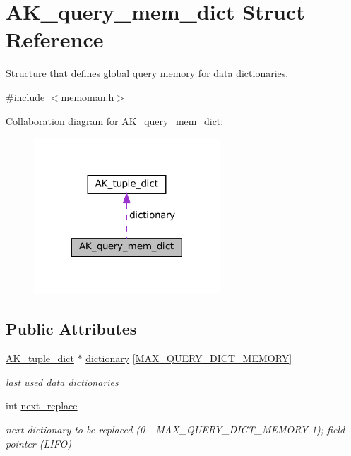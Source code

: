 \hypertarget{structAK__query__mem__dict}{}\section{A\+K\+\_\+query\+\_\+mem\+\_\+dict Struct Reference}
\label{structAK__query__mem__dict}


Structure that defines global query memory for data dictionaries.  




{\ttfamily \#include $<$memoman.\+h$>$}



Collaboration diagram for A\+K\+\_\+query\+\_\+mem\+\_\+dict\+:\nopagebreak
\begin{figure}[H]
\begin{center}
\leavevmode
\includegraphics[width=197pt]{structAK__query__mem__dict__coll__graph}
\end{center}
\end{figure}
\subsection*{Public Attributes}
\begin{DoxyCompactItemize}
\item 
\mbox{\label{structAK__query__mem__dict_a7345f65af9aecdbb66a14d6e81a8b012}} 
\hyperlink{structAK__tuple__dict}{A\+K\+\_\+tuple\+\_\+dict} $\ast$ \hyperlink{structAK__query__mem__dict_a7345f65af9aecdbb66a14d6e81a8b012}{dictionary} \mbox{[}\hyperlink{constants_8h_a2c730b958582a0cc5562e8742d13fe7e}{M\+A\+X\+\_\+\+Q\+U\+E\+R\+Y\+\_\+\+D\+I\+C\+T\+\_\+\+M\+E\+M\+O\+RY}\mbox{]}
\begin{DoxyCompactList}\small\item\em last used data dictionaries \end{DoxyCompactList}\item 
\mbox{\label{structAK__query__mem__dict_a9029c5332af6a016de520e13889a846f}} 
int \hyperlink{structAK__query__mem__dict_a9029c5332af6a016de520e13889a846f}{next\+\_\+replace}
\begin{DoxyCompactList}\small\item\em next dictionary to be replaced (0 -\/ M\+A\+X\+\_\+\+Q\+U\+E\+R\+Y\+\_\+\+D\+I\+C\+T\+\_\+\+M\+E\+M\+O\+R\+Y-\/1); field pointer (L\+I\+FO) \end{DoxyCompactList}\end{DoxyCompactItemize}


